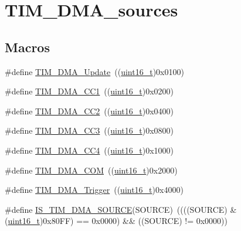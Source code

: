 \hypertarget{group___t_i_m___d_m_a__sources}{}\section{T\+I\+M\+\_\+\+D\+M\+A\+\_\+sources}
\label{group___t_i_m___d_m_a__sources}
\subsection*{Macros}
\begin{DoxyCompactItemize}
\item 
\#define \hyperlink{group___t_i_m___d_m_a__sources_ga013a49e5cceb263f01941aef968dea9c}{T\+I\+M\+\_\+\+D\+M\+A\+\_\+\+Update}~((\hyperlink{_p_e___types_8h_a1f1825b69244eb3ad2c7165ddc99c956}{uint16\+\_\+t})0x0100)
\item 
\#define \hyperlink{group___t_i_m___d_m_a__sources_ga33b93e8bb82fe8e167b9e9c962c54f83}{T\+I\+M\+\_\+\+D\+M\+A\+\_\+\+C\+C1}~((\hyperlink{_p_e___types_8h_a1f1825b69244eb3ad2c7165ddc99c956}{uint16\+\_\+t})0x0200)
\item 
\#define \hyperlink{group___t_i_m___d_m_a__sources_ga792f73196a8e7424655592097d7a3fd5}{T\+I\+M\+\_\+\+D\+M\+A\+\_\+\+C\+C2}~((\hyperlink{_p_e___types_8h_a1f1825b69244eb3ad2c7165ddc99c956}{uint16\+\_\+t})0x0400)
\item 
\#define \hyperlink{group___t_i_m___d_m_a__sources_ga3eb2dadbd3109bced45935fb53deeee1}{T\+I\+M\+\_\+\+D\+M\+A\+\_\+\+C\+C3}~((\hyperlink{_p_e___types_8h_a1f1825b69244eb3ad2c7165ddc99c956}{uint16\+\_\+t})0x0800)
\item 
\#define \hyperlink{group___t_i_m___d_m_a__sources_ga59495cf79894dfe5e5b2029863aed956}{T\+I\+M\+\_\+\+D\+M\+A\+\_\+\+C\+C4}~((\hyperlink{_p_e___types_8h_a1f1825b69244eb3ad2c7165ddc99c956}{uint16\+\_\+t})0x1000)
\item 
\#define \hyperlink{group___t_i_m___d_m_a__sources_gac5f4c56e944bda8ba0c23b97275020ba}{T\+I\+M\+\_\+\+D\+M\+A\+\_\+\+C\+OM}~((\hyperlink{_p_e___types_8h_a1f1825b69244eb3ad2c7165ddc99c956}{uint16\+\_\+t})0x2000)
\item 
\#define \hyperlink{group___t_i_m___d_m_a__sources_ga81ad169a378969524e61396337d84a0a}{T\+I\+M\+\_\+\+D\+M\+A\+\_\+\+Trigger}~((\hyperlink{_p_e___types_8h_a1f1825b69244eb3ad2c7165ddc99c956}{uint16\+\_\+t})0x4000)
\item 
\#define \hyperlink{group___t_i_m___d_m_a__sources_gafb9cb1995ea4cd37db6032d80a49cd47}{I\+S\+\_\+\+T\+I\+M\+\_\+\+D\+M\+A\+\_\+\+S\+O\+U\+R\+CE}(S\+O\+U\+R\+CE)~((((S\+O\+U\+R\+CE) \& (\hyperlink{_p_e___types_8h_a1f1825b69244eb3ad2c7165ddc99c956}{uint16\+\_\+t})0x80\+F\+F) == 0x0000) \&\& ((\+S\+O\+U\+R\+C\+E) != 0x0000))

\end{DoxyCompactItemize}
